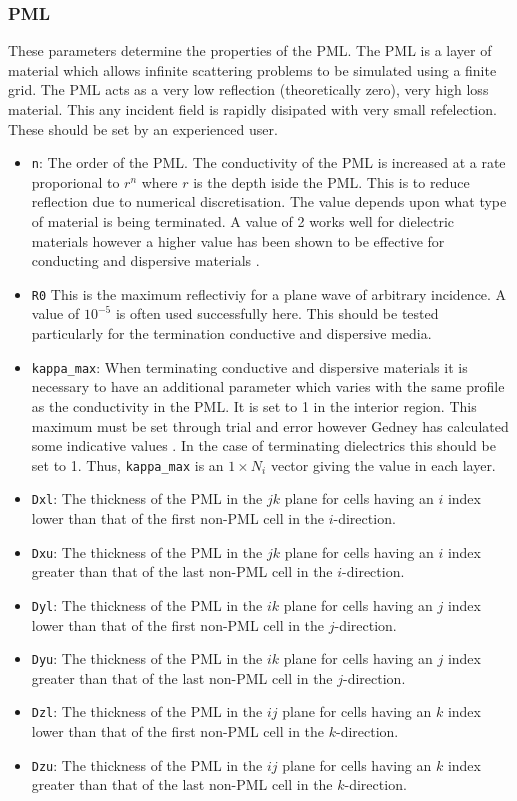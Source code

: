 \documentclass[a4paper, 12pt]{article}
\begin{document}
	\subsubsection{PML}
	These parameters determine the properties of the PML. The PML is a
	layer of material which allows infinite scattering problems to be
	simulated using a finite grid. The PML acts as a very low reflection
	(theoretically zero), very high loss material. This any incident field
	is rapidly disipated with very small refelection. These should be set
	by an experienced user.
	\begin{itemize}
		\item \verb+n+: The order of the PML. The conductivity of the PML is
		increased at a rate proporional to $r^n$ where $r$ is the depth
		iside the PML. This is to reduce reflection due to numerical
		discretisation. The value depends upon what type of material is
		being terminated. A value of 2 works well for dielectric materials
		however a higher value has been shown to be effective for conducting
		and dispersive materials \cite{gedney96electromagnetics399,gedney96ieeetransantprop1630}.
		\item \verb+R0+ This is the maximum reflectiviy for a plane wave of
		arbitrary incidence. A value of $10^{-5}$ is often used successfully
		here. This should be tested particularly for the termination conductive and dispersive
		media.
		\item \verb+kappa_max+: When terminating conductive and dispersive
		materials it is necessary to have an additional parameter which
		varies with the same profile as the conductivity in the PML. It is
		set to 1 in the interior region. This maximum must be set through
		trial and error however Gedney has calculated some indicative values
		\cite{gedney96electromagnetics399,gedney96ieeetransantprop1630}. In
		the case of terminating dielectrics this should be set to 1. Thus,
		\verb+kappa_max+ is an $1\times N_i$ vector giving the value in each layer.
		\item \verb+Dxl+: The thickness of the PML in the $jk$ plane for cells
		having an $i$ index lower than that of the first non-PML cell in the
		$i$-direction.
		\item \verb+Dxu+: The thickness of the PML in the $jk$ plane for cells
		having an $i$ index greater than that of the last non-PML cell in
		the $i$-direction.
		\item \verb+Dyl+: The thickness of the PML in the $ik$ plane for cells
		having an $j$ index lower than that of the first non-PML cell in the
		$j$-direction.
		\item \verb+Dyu+: The thickness of the PML in the $ik$ plane for cells
		having an $j$ index greater than that of the last non-PML cell in
		the $j$-direction.
		\item \verb+Dzl+: The thickness of the PML in the $ij$ plane for cells
		having an $k$ index lower than that of the first non-PML cell in the
		$k$-direction.
		\item \verb+Dzu+: The thickness of the PML in the $ij$ plane for cells
		having an $k$ index greater than that of the last non-PML cell in
		the $k$-direction.
	\end{itemize}
\end{document}
